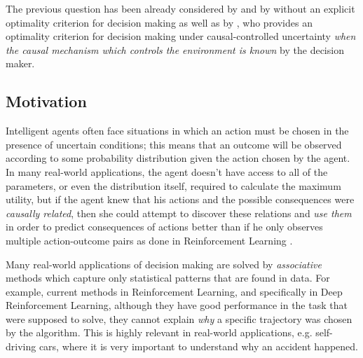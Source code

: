 \documentclass{svjour3}                     %
\begin{document}
The previous question has been already considered by \cite{nozick1969newcomb,lewis1981causal} and by \cite{joyce1999foundations} without an explicit optimality criterion for decision making as well as by \cite{pearl2009causality}, who provides an optimality criterion for decision making under causal-controlled uncertainty \textit{when the causal mechanism which controls the environment is known} by the decision maker. 

\subsection{Motivation}
Intelligent agents often face situations in which an action must be chosen in the presence of uncertain conditions; this means that an outcome will be observed according to some probability distribution given the action chosen by the agent. In many real-world applications, the agent doesn't have access to all of the parameters, or even the distribution itself, required to calculate the maximum utility, but if the agent knew that his actions and the possible consequences were \textit{causally related}, then she could attempt to discover these relations and \textit{use them} in order to predict consequences of actions better than if he only observes multiple action-outcome pairs as done in Reinforcement Learning \citep{sutton1998reinforcement}. 
	
Many real-world applications of decision making are solved by \textit{associative} methods which capture only statistical patterns that are found in data. For example, current methods in Reinforcement Learning, and specifically in Deep Reinforcement Learning, although they have good performance in the task that were supposed to solve, they cannot explain \textit{why} a specific trajectory was chosen by the algorithm. This is highly relevant in real-world applications, e.g. self-driving cars, where it is very important to understand why an accident happened. 
	
	
\end{document}
